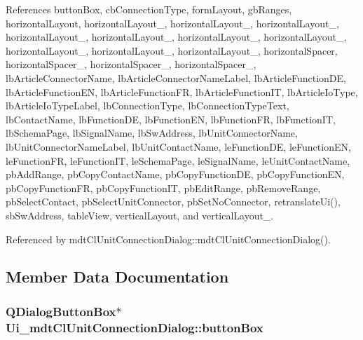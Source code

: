 References button\-Box, cb\-Connection\-Type, form\-Layout, gb\-Ranges, horizontal\-Layout, horizontal\-Layout\-\_, horizontal\-Layout\-\_, horizontal\-Layout\-\_, horizontal\-Layout\-\_, horizontal\-Layout\-\_, horizontal\-Layout\-\_, horizontal\-Layout\-\_, horizontal\-Layout\-\_, horizontal\-Layout\-\_, horizontal\-Layout\-\_, horizontal\-Spacer, horizontal\-Spacer\-\_, horizontal\-Spacer\-\_, horizontal\-Spacer\-\_, lb\-Article\-Connector\-Name, lb\-Article\-Connector\-Name\-Label, lb\-Article\-Function\-D\-E, lb\-Article\-Function\-E\-N, lb\-Article\-Function\-F\-R, lb\-Article\-Function\-I\-T, lb\-Article\-Io\-Type, lb\-Article\-Io\-Type\-Label, lb\-Connection\-Type, lb\-Connection\-Type\-Text, lb\-Contact\-Name, lb\-Function\-D\-E, lb\-Function\-E\-N, lb\-Function\-F\-R, lb\-Function\-I\-T, lb\-Schema\-Page, lb\-Signal\-Name, lb\-Sw\-Address, lb\-Unit\-Connector\-Name, lb\-Unit\-Connector\-Name\-Label, lb\-Unit\-Contact\-Name, le\-Function\-D\-E, le\-Function\-E\-N, le\-Function\-F\-R, le\-Function\-I\-T, le\-Schema\-Page, le\-Signal\-Name, le\-Unit\-Contact\-Name, pb\-Add\-Range, pb\-Copy\-Contact\-Name, pb\-Copy\-Function\-D\-E, pb\-Copy\-Function\-E\-N, pb\-Copy\-Function\-F\-R, pb\-Copy\-Function\-I\-T, pb\-Edit\-Range, pb\-Remove\-Range, pb\-Select\-Contact, pb\-Select\-Unit\-Connector, pb\-Set\-No\-Connector, retranslate\-Ui(), sb\-Sw\-Address, table\-View, vertical\-Layout, and vertical\-Layout\-\_.



Referenced by mdt\-Cl\-Unit\-Connection\-Dialog\-::mdt\-Cl\-Unit\-Connection\-Dialog().



\subsection{Member Data Documentation}
\hypertarget{class_ui__mdt_cl_unit_connection_dialog_acd62e7c253b20570b6b6e29c86750bd2}{
\subsubsection[{button\-Box}]{\setlength{\rightskip}{0pt plus 5cm}Q\-Dialog\-Button\-Box$\ast$ Ui\-\_\-mdt\-Cl\-Unit\-Connection\-Dialog\-::button\-Box}}\label{class_ui__mdt_cl_unit_connection_dialog_acd62e7c253b20570b6b6e29c86750bd2}


